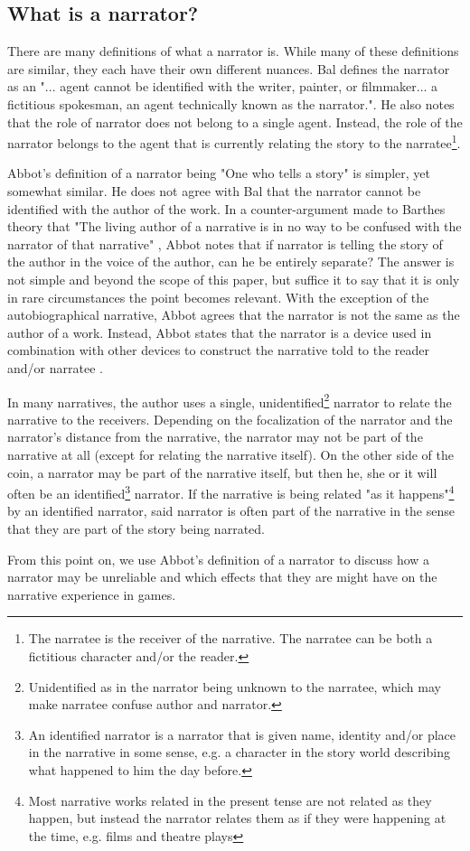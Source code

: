 \subsection{What is a narrator?}
There are many definitions of what a narrator is. 
While many of these definitions are similar, they each have their own different nuances. 
Bal defines the narrator as an "... agent cannot be identified with the writer, painter, or filmmaker... a fictitious spokesman, an agent technically known as the narrator."\cite[p. 8]{Bal}. 
He also notes that the role of narrator does not belong to a single agent. Instead, the role of the narrator belongs to the agent that is currently relating the story to the narratee\footnote{The narratee is the receiver of the narrative. The narratee can be both a fictitious character and/or the reader.}. 

Abbot's definition of a narrator being "One who tells a story"\cite[p. 238]{Abbot} is simpler, yet somewhat similar. 
He does not agree with Bal that the narrator cannot be identified with the author of the work. 
In a counter-argument made to Barthes theory that "The living author of a narrative is in no way to be confused with the narrator of that narrative" \cite[p. 261]{Barthes}, Abbot notes that if narrator is telling the story of the author in the voice of the author, can he be entirely separate? 
The answer is not simple and beyond the scope of this paper, but suffice it to say that it is only in rare circumstances the point becomes relevant. 
With the exception of the autobiographical narrative, Abbot agrees that the narrator is not the same as the author of a work.
Instead, Abbot states that the narrator is a device used in combination with other devices to construct the narrative told to the reader and/or narratee \cite[p. 69]{Abbot}.

In many narratives, the author uses a single, unidentified\footnote{Unidentified as in the narrator being unknown to the narratee, which may make narratee confuse author and narrator.} narrator to relate the narrative to the receivers. 
Depending on the focalization of the narrator and the narrator's distance from the narrative, the narrator may not be part of the narrative at all (except for relating the narrative itself). 
On the other side of the coin, a narrator may be part of the narrative itself, but then he, she or it will often be an identified\footnote{An identified narrator is a narrator that is given name, identity and/or place in the narrative in some sense, e.g. a character in the story world describing what happened to him the day before.} narrator. 
If the narrative is being related "as it happens"\footnote{Most narrative works related in the present tense are not related as they happen, but instead the narrator relates them as if they were happening at the time, e.g. films and theatre plays} by an identified narrator, said narrator is often part of the narrative in the sense that they are part of the story being narrated.

From this point on, we use Abbot's definition of a narrator to discuss how a narrator may be unreliable and which effects that they are might have on the narrative experience in games.